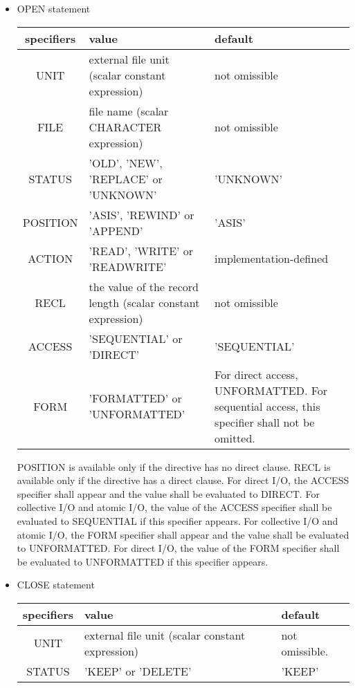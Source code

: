    \begin{itemize}
   \item OPEN statement
   
   \begin{table}[h]
    \begin{center}
     \label{tb:globalopen}
     \begin{tabular}{|c||p{55mm}|p{70mm}|}
       \hline
       specifiers & value & default \\ \hline \hline
      UNIT & external file unit (scalar constant expression) & not omissible \\ \hline
      FILE & file name (scalar CHARACTER expression) & not omissible \\ \hline
      STATUS & 'OLD', 'NEW', 'REPLACE' or 'UNKNOWN' & 'UNKNOWN' \\ \hline
      POSITION & 'ASIS', 'REWIND' or 'APPEND' & 'ASIS' \\ \hline
      ACTION & 'READ', 'WRITE' or 'READWRITE' & implementation-defined \\ \hline
      RECL & the value of the record length (scalar constant expression) & not omissible \\ \hline
      ACCESS & 'SEQUENTIAL' or 'DIRECT' & 'SEQUENTIAL' \\ \hline
      FORM & 'FORMATTED' or 'UNFORMATTED' & For direct access, UNFORMATTED. For sequential access, this specifier shall not be omitted. \\ \hline
     \end{tabular}
    \end{center}
   \end{table}

   POSITION is available only if the directive has no direct clause.
   RECL is available only if the directive has a direct clause.
   For direct I/O, the ACCESS specifier shall appear and the value shall be evaluated to DIRECT.
   For collective I/O and atomic I/O, the value of the ACCESS specifier shall be evaluated to SEQUENTIAL if this specifier appears.
   For collective I/O and atomic I/O, the FORM specifier shall appear and the value shall be evaluated to UNFORMATTED.
   For direct I/O, the value of the FORM specifier shall be evaluated to UNFORMATTED if this specifier appears.

   \item CLOSE statement
	  
   \begin{table}[h]
    \begin{center}
     \label{tb:globalopen}
     \begin{tabular}{|c||p{90mm}|l|}
        \hline
      specifiers & value & default \\ \hline \hline
      UNIT & external file unit (scalar constant expression)
      & not omissible. \\ \hline
      STATUS & 'KEEP' or 'DELETE'
	  & 'KEEP' \\ \hline
     \end{tabular}
    \end{center}
   \end{table}


\end{itemize}
